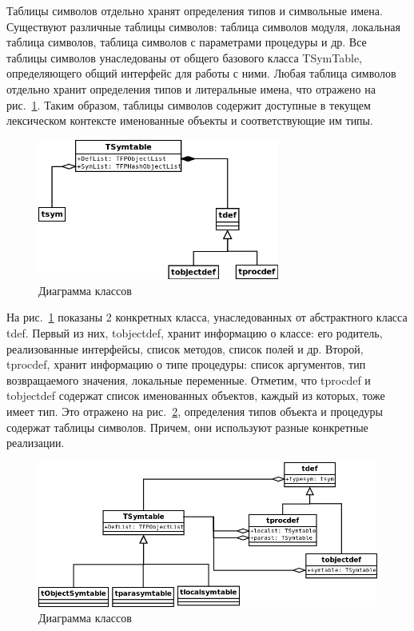 \documentclass{imcs}
\begin{document}
Таблицы символов отдельно хранят определения типов и символьные имена. Существуют 
различные таблицы символов: таблица символов модуля, локальная таблица символов, таблица
символов с параметрами процедуры и др. Все таблицы символов унаследованы от общего
базового класса TSymTable, определяющего общий интерфейс для работы с ними. Любая таблица символов отдельно
хранит определения типов и литеральные имена, что отражено на рис.~\ref{symboltable-sym-def}.
Таким образом, таблицы символов содержит доступные в текущем лексическом контексте
именованные объекты и соответствующие им типы.

\begin{figure}[htb]
\centering
\includegraphics[width=300px]{./uml/sym-def-def-inheritence.png}
\caption{Диаграмма классов}
\label{symboltable-sym-def}
\end{figure}

На рис.~\ref{symboltable-sym-def} показаны 2 конкретных класса, унаследованных от
абстрактного класса tdef. Первый из них, tobjectdef, хранит информацию о классе: 
его родитель, реализованные интерфейсы, список методов, список полей и др. Второй, tprocdef, хранит
информацию о типе процедуры: список аргументов, тип возвращаемого значения, локальные
переменные. Отметим, что tprocdef и tobjectdef содержат
список именованных объектов, каждый из которых, тоже имеет тип. Это отражено на
рис.~\ref{symtable-def}, определения типов объекта и процедуры содержат таблицы символов. Причем,
они используют разные конкретные реализации.

\begin{figure}[htb]
\centering
\includegraphics[width=\textwidth]{./uml/symtable-def.png}
\caption{Диаграмма классов}
\label{symtable-def}
\end{figure}
\end{document}
